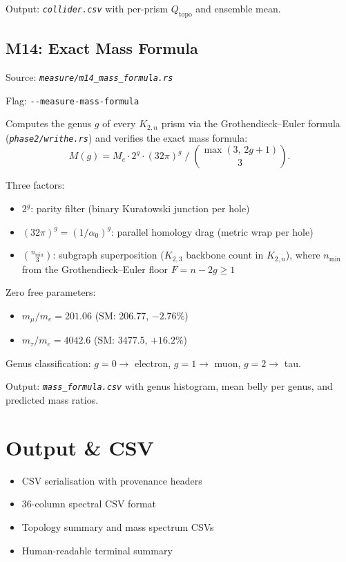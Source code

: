 \documentclass[11pt, a4paper, openany]{book}
\newcommand{\flag}[1]{\texttt{-{}-#1}}
\newcommand{\file}[1]{\texttt{\itshape #1}}
\newenvironment{introduction}[1][Chapter Overview]{%
  \begin{tcolorbox}[
    enhanced,colback=structure!5,colframe=structure,
    colbacktitle=structure,coltitle=white,
    fonttitle=\small\bfseries,title={#1},
    arc=2pt,boxrule=0.7pt,
    left=8pt,right=8pt,top=6pt,bottom=6pt,
    before skip=12pt,after skip=12pt
  ]\itshape\begin{itemize}[leftmargin=*,itemsep=2pt,parsep=0pt]
}{%
  \end{itemize}\end{tcolorbox}
}
\begin{document}
Output: \file{collider.csv} with per-prism $Q_{\text{topo}}$ and ensemble mean.

\section{M14: Exact Mass Formula}

Source: \file{measure/m14\_mass\_formula.rs}

Flag: \flag{measure-mass-formula}

Computes the genus $g$ of every $K_{2,n}$ prism via the Grothendieck--Euler
formula (\file{phase2/writhe.rs}) and verifies the exact mass formula:
\[
  M(g) = M_e \cdot 2^g \cdot (32\pi)^g \;\big/\; \binom{\max(3,\,2g+1)}{3}.
\]

Three factors:
\begin{itemize}
  \item $2^g$: parity filter (binary Kuratowski junction per hole)
  \item $(32\pi)^g = (1/\alpha_0)^g$: parallel homology drag (metric wrap per hole)
  \item $\binom{n_{\min}}{3}$: subgraph superposition ($K_{2,3}$ backbone count
        in $K_{2,n}$), where $n_{\min}$ from the Grothendieck--Euler floor
        $F = n - 2g \geq 1$
\end{itemize}

\begin{result}
  Zero free parameters:
  \begin{itemize}
    \item $m_\mu / m_e = 201.06$ \quad (SM: 206.77, $-2.76\%$)
    \item $m_\tau / m_e = 4042.6$ \quad (SM: 3477.5, $+16.2\%$)
  \end{itemize}
  Genus classification: $g = 0 \to$ electron, $g = 1 \to$ muon, $g = 2 \to$ tau.
\end{result}

Output: \file{mass\_formula.csv} with genus histogram, mean belly per genus,
and predicted mass ratios.


\chapter{Output \& CSV}

\begin{introduction}
  \item CSV serialisation with provenance headers
  \item 36-column spectral CSV format
  \item Topology summary and mass spectrum CSVs
  \item Human-readable terminal summary
\end{introduction}
\end{document}
